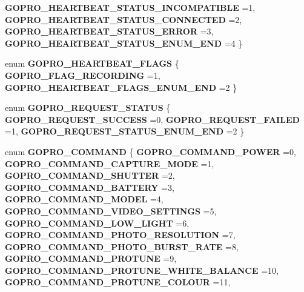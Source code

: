 \begin{DoxyCompactItemize}
\textbf{ G\+O\+P\+R\+O\+\_\+\+H\+E\+A\+R\+T\+B\+E\+A\+T\+\_\+\+S\+T\+A\+T\+U\+S\+\_\+\+I\+N\+C\+O\+M\+P\+A\+T\+I\+B\+LE} =1, 
\textbf{ G\+O\+P\+R\+O\+\_\+\+H\+E\+A\+R\+T\+B\+E\+A\+T\+\_\+\+S\+T\+A\+T\+U\+S\+\_\+\+C\+O\+N\+N\+E\+C\+T\+ED} =2, 
\textbf{ G\+O\+P\+R\+O\+\_\+\+H\+E\+A\+R\+T\+B\+E\+A\+T\+\_\+\+S\+T\+A\+T\+U\+S\+\_\+\+E\+R\+R\+OR} =3, 
\newline
\textbf{ G\+O\+P\+R\+O\+\_\+\+H\+E\+A\+R\+T\+B\+E\+A\+T\+\_\+\+S\+T\+A\+T\+U\+S\+\_\+\+E\+N\+U\+M\+\_\+\+E\+ND} =4
 \}
\item 
enum \textbf{ G\+O\+P\+R\+O\+\_\+\+H\+E\+A\+R\+T\+B\+E\+A\+T\+\_\+\+F\+L\+A\+GS} \{ \textbf{ G\+O\+P\+R\+O\+\_\+\+F\+L\+A\+G\+\_\+\+R\+E\+C\+O\+R\+D\+I\+NG} =1, 
\textbf{ G\+O\+P\+R\+O\+\_\+\+H\+E\+A\+R\+T\+B\+E\+A\+T\+\_\+\+F\+L\+A\+G\+S\+\_\+\+E\+N\+U\+M\+\_\+\+E\+ND} =2
 \}
\item 
enum \textbf{ G\+O\+P\+R\+O\+\_\+\+R\+E\+Q\+U\+E\+S\+T\+\_\+\+S\+T\+A\+T\+US} \{ \textbf{ G\+O\+P\+R\+O\+\_\+\+R\+E\+Q\+U\+E\+S\+T\+\_\+\+S\+U\+C\+C\+E\+SS} =0, 
\textbf{ G\+O\+P\+R\+O\+\_\+\+R\+E\+Q\+U\+E\+S\+T\+\_\+\+F\+A\+I\+L\+ED} =1, 
\textbf{ G\+O\+P\+R\+O\+\_\+\+R\+E\+Q\+U\+E\+S\+T\+\_\+\+S\+T\+A\+T\+U\+S\+\_\+\+E\+N\+U\+M\+\_\+\+E\+ND} =2
 \}
\item 
enum \textbf{ G\+O\+P\+R\+O\+\_\+\+C\+O\+M\+M\+A\+ND} \{ \newline
\textbf{ G\+O\+P\+R\+O\+\_\+\+C\+O\+M\+M\+A\+N\+D\+\_\+\+P\+O\+W\+ER} =0, 
\textbf{ G\+O\+P\+R\+O\+\_\+\+C\+O\+M\+M\+A\+N\+D\+\_\+\+C\+A\+P\+T\+U\+R\+E\+\_\+\+M\+O\+DE} =1, 
\textbf{ G\+O\+P\+R\+O\+\_\+\+C\+O\+M\+M\+A\+N\+D\+\_\+\+S\+H\+U\+T\+T\+ER} =2, 
\textbf{ G\+O\+P\+R\+O\+\_\+\+C\+O\+M\+M\+A\+N\+D\+\_\+\+B\+A\+T\+T\+E\+RY} =3, 
\newline
\textbf{ G\+O\+P\+R\+O\+\_\+\+C\+O\+M\+M\+A\+N\+D\+\_\+\+M\+O\+D\+EL} =4, 
\textbf{ G\+O\+P\+R\+O\+\_\+\+C\+O\+M\+M\+A\+N\+D\+\_\+\+V\+I\+D\+E\+O\+\_\+\+S\+E\+T\+T\+I\+N\+GS} =5, 
\textbf{ G\+O\+P\+R\+O\+\_\+\+C\+O\+M\+M\+A\+N\+D\+\_\+\+L\+O\+W\+\_\+\+L\+I\+G\+HT} =6, 
\textbf{ G\+O\+P\+R\+O\+\_\+\+C\+O\+M\+M\+A\+N\+D\+\_\+\+P\+H\+O\+T\+O\+\_\+\+R\+E\+S\+O\+L\+U\+T\+I\+ON} =7, 
\newline
\textbf{ G\+O\+P\+R\+O\+\_\+\+C\+O\+M\+M\+A\+N\+D\+\_\+\+P\+H\+O\+T\+O\+\_\+\+B\+U\+R\+S\+T\+\_\+\+R\+A\+TE} =8, 
\textbf{ G\+O\+P\+R\+O\+\_\+\+C\+O\+M\+M\+A\+N\+D\+\_\+\+P\+R\+O\+T\+U\+NE} =9, 
\textbf{ G\+O\+P\+R\+O\+\_\+\+C\+O\+M\+M\+A\+N\+D\+\_\+\+P\+R\+O\+T\+U\+N\+E\+\_\+\+W\+H\+I\+T\+E\+\_\+\+B\+A\+L\+A\+N\+CE} =10, 
\textbf{ G\+O\+P\+R\+O\+\_\+\+C\+O\+M\+M\+A\+N\+D\+\_\+\+P\+R\+O\+T\+U\+N\+E\+\_\+\+C\+O\+L\+O\+UR} =11, 

\end{DoxyCompactItemize}
